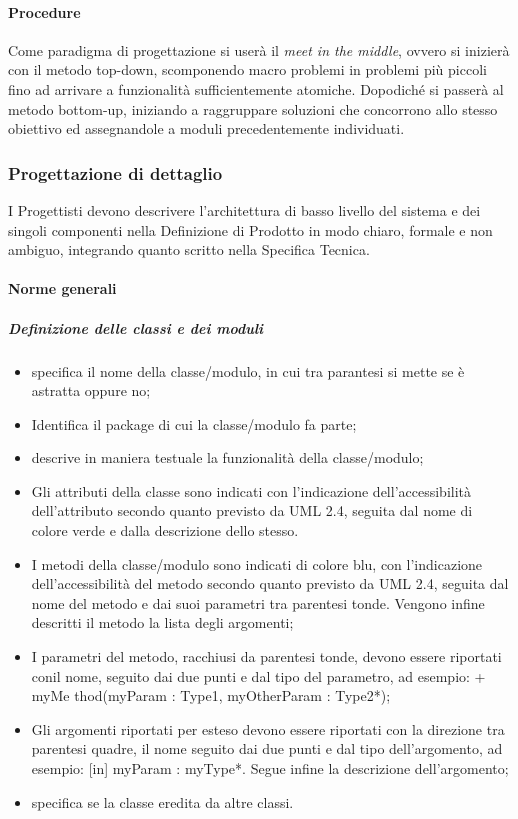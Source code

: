 \paragraph{Procedure}
Come paradigma di progettazione si userà il \textit{meet in the middle}, ovvero si inizierà con il metodo top-down, scomponendo macro problemi in problemi più piccoli fino ad arrivare a funzionalità sufficientemente atomiche.
Dopodiché si passerà al metodo bottom-up, iniziando a raggruppare soluzioni che concorrono allo stesso obiettivo ed assegnandole a moduli precedentemente individuati.


\subsubsection{Progettazione di dettaglio}
\label{prog_dettaglio}
I Progettisti devono descrivere l'architettura di basso livello del sistema e dei singoli componenti nella Definizione di Prodotto in modo chiaro, formale e non ambiguo, integrando quanto scritto nella Specifica Tecnica.


\paragraph{Norme generali}
\subparagraph{Definizione delle classi e dei moduli}
\label{}

\begin{itemize}
\item {}specifica il nome della classe/modulo, in cui tra parantesi si mette se è astratta oppure no;
\item {} Identifica il package di cui la classe/modulo fa parte;
\item {}descrive in maniera testuale la funzionalità della classe/modulo;
\item {}Gli attributi della classe sono indicati con l’indicazione dell’accessibilità dell’attributo secondo quanto previsto da UML 2.4, seguita dal nome di colore verde e dalla descrizione dello stesso.
\item {}I metodi della classe/modulo sono indicati di colore blu, con l’indicazione dell’accessibilità del metodo secondo quanto previsto da UML 2.4, seguita dal nome del metodo e  dai suoi parametri tra parentesi tonde.
Vengono infine descritti il metodo  la lista degli argomenti;
\item {} I parametri del metodo, racchiusi da parentesi tonde, devono essere riportati conil nome, seguito dai due punti e dal tipo del parametro, ad esempio: + myMe
thod(myParam : Type1, myOtherParam : Type2*);
\item {}Gli argomenti riportati per esteso devono essere riportati con la direzione tra
parentesi quadre, il nome seguito dai due punti e dal tipo dell’argomento, ad
esempio: [in] myParam : myType*. Segue infine la descrizione dell’argomento;

\item {}specifica se la classe eredita da altre classi.
\end{itemize}

